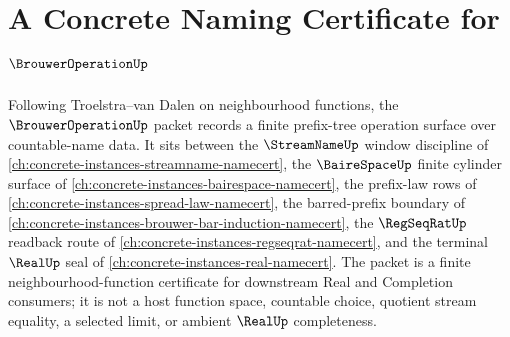 \chapter{A Concrete Naming Certificate for $\BrouwerOperationUp$}
\label{ch:concrete-instances-brouwer-operation-namecert}

Following Troelstra--van Dalen on neighbourhood functions, the $\BrouwerOperationUp$ packet records a finite prefix-tree operation surface over countable-name data. It sits between the $\StreamNameUp$ window discipline of \autoref{ch:concrete-instances-streamname-namecert}, the $\BaireSpaceUp$ finite cylinder surface of \autoref{ch:concrete-instances-bairespace-namecert}, the prefix-law rows of \autoref{ch:concrete-instances-spread-law-namecert}, the barred-prefix boundary of \autoref{ch:concrete-instances-brouwer-bar-induction-namecert}, the $\RegSeqRatUp$ readback route of \autoref{ch:concrete-instances-regseqrat-namecert}, and the terminal $\RealUp$ seal of \autoref{ch:concrete-instances-real-namecert}. The packet is a finite neighbourhood-function certificate for downstream Real and Completion consumers; it is not a host function space, countable choice, quotient stream equality, a selected limit, or ambient $\RealUp$ completeness.

